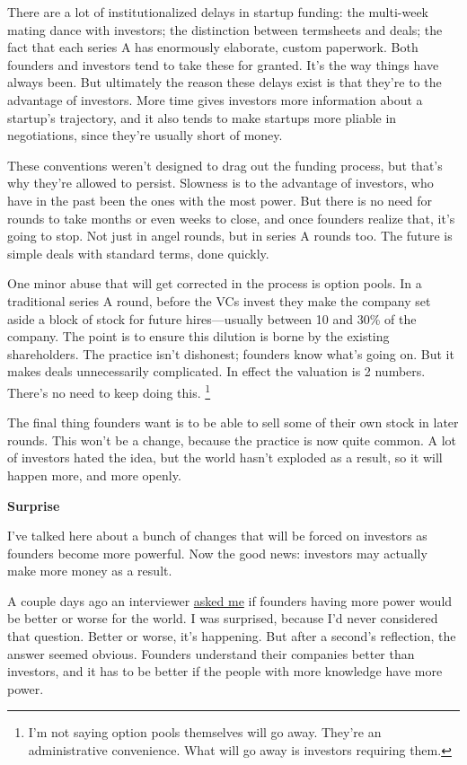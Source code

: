 There are a lot of institutionalized delays in startup funding: the
multi-week mating dance with investors; the distinction between
termsheets and deals; the fact that each series A has enormously
elaborate, custom paperwork. Both founders and investors tend to take
these for granted. It's the way things have always been. But ultimately
the reason these delays exist is that they're to the advantage of
investors. More time gives investors more information about a startup's
trajectory, and it also tends to make startups more pliable in
negotiations, since they're usually short of money.

These conventions weren't designed to drag out the funding process, but
that's why they're allowed to persist. Slowness is to the advantage of
investors, who have in the past been the ones with the most power. But
there is no need for rounds to take months or even weeks to close, and
once founders realize that, it's going to stop. Not just in angel
rounds, but in series A rounds too. The future is simple deals with
standard terms, done quickly.

One minor abuse that will get corrected in the process is option pools.
In a traditional series A round, before the VCs invest they make the
company set aside a block of stock for future hires---usually between 10
and 30\% of the company. The point is to ensure this dilution is borne
by the existing shareholders. The practice isn't dishonest; founders
know what's going on. But it makes deals unnecessarily complicated. In
effect the valuation is 2 numbers. There's no need to keep doing this.
\footnote{I'm not saying option pools themselves will go away. They're an
administrative convenience. What will go away is investors requiring
them.}

The final thing founders want is to be able to sell some of their own
stock in later rounds. This won't be a change, because the practice is
now quite common. A lot of investors hated the idea, but the world
hasn't exploded as a result, so it will happen more, and more openly.

\textbf{Surprise}

I've talked here about a bunch of changes that will be forced on
investors as founders become more powerful. Now the good news: investors
may actually make more money as a result.

A couple days ago an interviewer
\href{http://techcrunch.tv/watch?id=Q3amZtMTryrpiP80cbUtsV2ah92eZP2m}{asked
me} if founders having more power would be better or worse for the
world. I was surprised, because I'd never considered that question.
Better or worse, it's happening. But after a second's reflection, the
answer seemed obvious. Founders understand their companies better than
investors, and it has to be better if the people with more knowledge
have more power.

